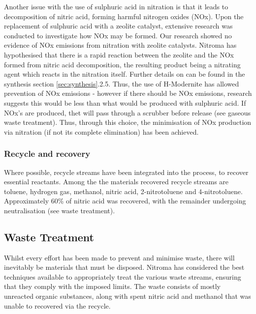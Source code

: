 
Another issue with the use of sulphuric acid in nitration is that it leads to decomposition of nitric acid, forming harmful nitrogen oxides (NOx). Upon the replacement of sulphuric acid with a zeolite catalyst, extensive research was conducted to investigate how NOx may be formed. Our research showed no evidence of NOx emissions from nitration with zeolite catalysts. Nitroma has hypothesised that there is a rapid reaction between the zeolite and the NOx formed from nitric acid decomposition, the resulting product being a nitrating agent which reacts in the nitration itself. Further details on can be found in the synthesis section \ref{sec:synthesis}.2.5. Thus, the use of H-Modernite has allowed prevention of NOx emissions - however if there should be NOx emissions, research suggests this would be less than what would be produced with sulphuric acid. If NOx's are produced, thet will pass through a scrubber before release (see gaseous waste treatment). Thus, through this choice, the minimisation of NOx production via nitration (if not its complete elimination) has been achieved. 


\subsubsection{Recycle and recovery}

Where possible, recycle streams have been integrated into the process, to recover essential reactants. Among the the materials recovered recycle streams are toluene, hydrogen gas, methanol, nitric acid, 2-nitrotoluene and 4-nitrotoluene. Approximately 60\% of nitric acid was recovered, with the remainder undergoing neutralisation (see waste treatment). 




\subsection{Waste Treatment}
\label{sec:waste}

Whilst every effort has been made to prevent and minimise waste, there will inevitably be materials that must be disposed. Nitroma has considered the best techniques available to appropriately treat the various waste streams, ensuring that they comply with the imposed limits. The waste consists of mostly unreacted organic substances, along with spent nitric acid and methanol that was unable to recovered via the recycle. 

